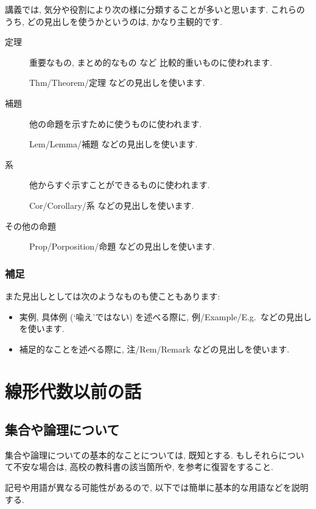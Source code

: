 講義では, 
気分や役割により次の様に分類することが多いと思います.
これらのうち, どの見出しを使うかというのは, 
かなり主観的です.
\begin{description}
\item[定理]
重要なもの, まとめ的なもの など 比較的重いものに使われます.

Thm/Theorem/定理  などの見出しを使います.

\item[補題]
他の命題を示すために使うものに使われます.

Lem/Lemma/補題  などの見出しを使います.

\item[系]
他からすぐ示すことができるものに使われます.

Cor/Corollary/系  などの見出しを使います.
\item[その他の命題]

Prop/Porposition/命題  などの見出しを使います.
\end{description}

\subsection{補足}
また見出しとしては次のようなものも使こともあります:
\begin{itemize}
 \item 
実例, 具体例 (`喩え'ではない) を述べる際に,
例/Example/E.g.\   などの見出しを使います.
\item
補足的なことを述べる際に,
注/Rem/Remark   などの見出しを使います.
\end{itemize}

\tableofcontents


\renewcommand{\thesection}{\originalthesection}
\mainmatter

\chapter{線形代数以前の話}


\section{集合や論理について}

集合や論理についての基本的なことについては,
既知とする.
もしそれらについて不安な場合は,
高校の教科書の該当箇所や,
\cite{978-4-535-78682-0}
を参考に復習をすること.

記号や用語が異なる可能性があるので,
以下では簡単に基本的な用語などを説明する.

